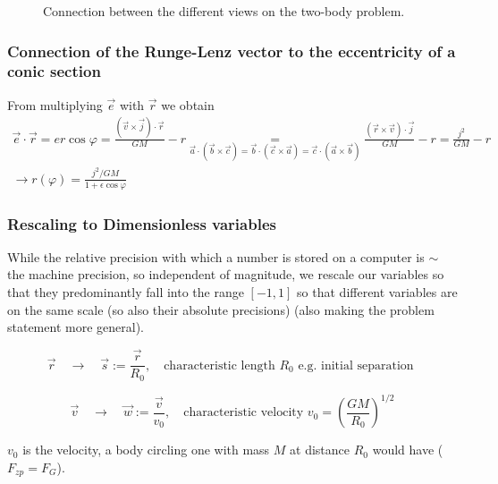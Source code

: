 \begin{figure}[!htb]
  \centering
  \hfill
  \caption{Connection between the different views on the two-body problem.}
  \label{fig:kepler_ov}
\end{figure}

\subsubsection{Connection of the Runge-Lenz vector to the eccentricity of a conic section}

From multiplying $\vec{e}$ with $\vec{r}$ we obtain
\begin{equation}
  \begin{gathered}
    \vec{e} \cdot \vec{r}= er \cos \varphi=\frac{(\vec{v} \times \vec{j}) \cdot \vec{r}}{G M}-r \underset{\vec{a} \cdot(\vec{b} \times \vec{c})=\vec{b} \cdot(\vec{c} \times \vec{a})=\vec{c} \cdot(\vec{a} \times \vec{b})}{=} \frac{(\vec{r} \times \vec{v}) \cdot \vec{j}}{G M}-r=\frac{j^2}{G M}-r \\
    \rightarrow r(\varphi)=\frac{j^2 / G M}{1+\epsilon \cos \varphi}
    \end{gathered}
\end{equation}

\subsubsection{Rescaling to Dimensionless variables}
While the relative precision with which a number is stored on a computer
is $\sim$ the machine precision, so independent of magnitude, we rescale our variables
so that they predominantly fall into the range $[-1,1]$ so that different variables are on the same scale (so also their absolute precisions) (also making the problem statement
more general).

\begin{equation}
  \vec{r} \quad \rightarrow \quad \vec{s} := \frac{\vec{r}}{R_0}, \quad \text{characteristic length } R_0 \text{ e.g. initial separation }
\end{equation}

\begin{equation}
  \vec{v} \quad \rightarrow \quad \vec{w} := \frac{\vec{v}}{v_0}, \quad \text{characteristic velocity } v_0 = \left( \frac{GM}{R_0} \right)^{1/2}
\end{equation}

$v_0$ is the velocity, a body circling one with mass $M$ at distance $R_0$ would have ($F_{zp} = F_G$).

